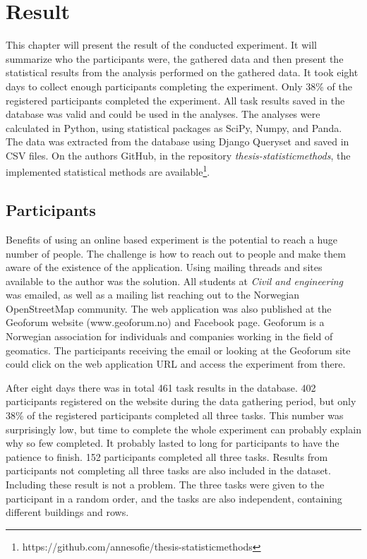 \chapter{Result}
This chapter will present the result of the conducted experiment. It will summarize who the participants were, the gathered data and then present the statistical results from the analysis performed on the gathered data. It took eight days to collect enough participants completing the experiment. Only 38\% of the registered participants completed the experiment. All task results saved in the database was valid and could be used in the analyses. The analyses were calculated in Python, using statistical packages as SciPy, Numpy, and Panda. The data was extracted from the database using Django Queryset and saved in CSV files. On the authors GitHub, in the repository \textit{thesis-statisticmethods}, the implemented statistical methods are available\footnote{https://github.com/annesofie/thesis-statisticmethods}. 

\section{Participants}
Benefits of using an online based experiment is the potential to reach a huge number of people. The challenge is how to reach out to people and make them aware of the existence of the application. Using mailing threads and sites available to the author was the solution. All students at \textit{Civil and engineering} was emailed, as well as a mailing list reaching out to the Norwegian OpenStreetMap community. The web application was also published at the Geoforum website (www.geoforum.no) and Facebook page. Geoforum is a Norwegian association for individuals and companies working in the field of geomatics. The participants receiving the email or looking at the Geoforum site could click on the web application URL and access the experiment from there. 

After eight days there was in total 461 task results in the database. 402 participants registered on the website during the data gathering period, but only 38\% of the registered participants completed all three tasks. This number was surprisingly low, but time to complete the whole experiment can probably explain why so few completed. It probably lasted to long for participants to have the patience to finish. 152 participants completed all three tasks. Results from participants not completing all three tasks are also included in the dataset. Including these result is not a problem. The three tasks were given to the participant in a random order, and the tasks are also independent, containing different buildings and rows. %

